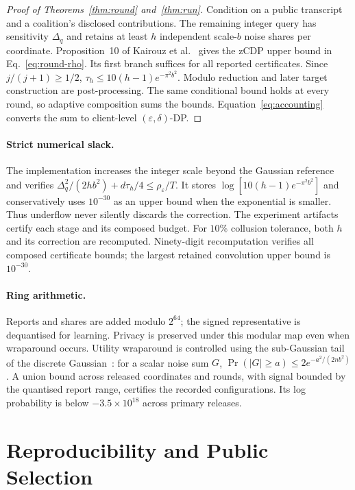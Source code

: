 \begin{proof}[Proof of Theorems~\ref{thm:round} and~\ref{thm:run}]
Condition on a public transcript and a coalition's disclosed contributions.
The remaining integer query has sensitivity $\Delta_q$ and retains at least
$h$ independent scale-$b$ noise shares per coordinate.
Proposition~10 of Kairouz et al.~\cite{kairouz2021distributed} gives the
zCDP upper bound in Eq.~\eqref{eq:round-rho}. Its first branch suffices for
all reported certificates. Since $j/(j+1)\ge1/2$,
$\tau_h\le10(h-1)e^{-\pi^2b^2}$.
Modulo reduction and later target construction are post-processing.
The same conditional bound holds at every round, so adaptive composition
sums the bounds. Equation~\eqref{eq:accounting} converts the sum to
client-level $(\varepsilon,\delta)$-DP.
\end{proof}

\paragraph{Strict numerical slack.}
The implementation increases the integer scale beyond the Gaussian reference
and verifies $\Delta_q^2/(2hb^2)+d\tau_h/4\le\rho_\varepsilon/T$.
It stores $\log[10(h-1)e^{-\pi^2b^2}]$ and conservatively uses
$10^{-30}$ as an upper bound when the exponential is smaller.
Thus underflow never silently discards the correction.
The experiment artifacts certify each stage and its composed budget.
For $10\%$ collusion tolerance, both $h$ and its correction are recomputed.
Ninety-digit recomputation verifies all composed certificate bounds; the
largest retained convolution upper bound is $10^{-30}$.

\paragraph{Ring arithmetic.}
Reports and shares are added modulo $2^{64}$; the signed representative is
dequantised for learning. Privacy is preserved under this modular map even
when wraparound occurs. Utility wraparound is controlled using the
sub-Gaussian tail of the discrete Gaussian~\cite{kairouz2021distributed}:
for a scalar noise sum $G$, $\Pr(|G|\ge a)\le2e^{-a^2/(2nb^2)}$.
A union bound across released coordinates and rounds, with signal bounded by
the quantised report range, certifies the recorded configurations.
Its log probability is below $-3.5\times10^{18}$ across primary releases.



\section{Reproducibility and Public Selection}
\label{app:repro}

